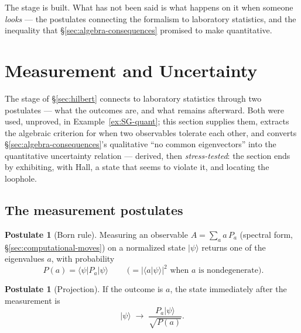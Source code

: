 \documentclass[11pt]{article}
\theoremstyle{plain}
\theoremstyle{definition}
\newtheorem{postulate}[theorem]{Postulate}
\theoremstyle{remark}
\newcommand{\ket}[1]{\lvert #1 \rangle}
\newcommand{\bra}[1]{\langle #1 \rvert}
\newcommand{\braket}[2]{\langle #1 | #2 \rangle}
\begin{document}
\medskip
\noindent
The stage is built. What has not been said is what happens on it
when someone \emph{looks} --- the postulates connecting the
formalism to laboratory statistics, and the inequality that
\S\ref{sec:algebra-consequences} promised to make quantitative.


\section{Measurement and Uncertainty}
\label{sec:measurement}

The stage of \S\ref{sec:hilbert} connects to laboratory statistics
through two postulates --- what the outcomes are, and what remains
afterward. Both were used, unproved, in
Example~\ref{ex:SG-quant}; this section supplies them, extracts the
algebraic criterion for when two observables tolerate each other,
and converts \S\ref{sec:algebra-consequences}'s qualitative ``no
common eigenvectors'' into the quantitative uncertainty relation ---
derived, then \emph{stress-tested}: the section ends by exhibiting,
with Hall, a state that seems to violate it, and locating the
loophole.

\subsection{The measurement postulates}
\label{sec:postulates-measurement}

\begin{postulate}[Born rule]\label{post:born}
Measuring an observable $A = \sum_a a\,P_a$ (spectral form,
\S\ref{sec:computational-moves}) on a normalized state $\ket\psi$
returns one of the eigenvalues $a$, with probability
\begin{equation}
  \boxed{\;
  P(a) = \bra\psi P_a \ket\psi
  \;}
  \qquad
  \bigl(= |\braket a\psi|^2 \text{ when } a \text{ is
  nondegenerate}\bigr).
  \label{eq:born}
\end{equation}
\end{postulate}

\begin{postulate}[Projection]\label{post:projection}
If the outcome is $a$, the state immediately after the measurement
is
\begin{equation}
  \ket\psi \;\longrightarrow\;
  \frac{P_a\ket\psi}{\sqrt{P(a)}} .
  \label{eq:collapse}
\end{equation}
\end{postulate}
\end{document}
